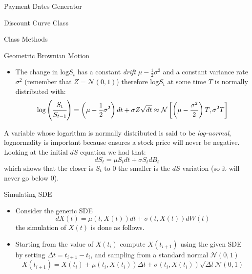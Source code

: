 \documentclass{beamer}
\begin{document}
\begin{frame}[fragile]{Payment Dates Generator}
\begin{itemize}
\begin{frame}{Discount Curve Class}
\begin{frame}{Class Methods}
\begin{itemize}
\begin{iptyhon}
\begin{frame}{Geometric Brownian Motion}
\begin{itemize}
\item The change in $\textrm{log} S_t$ has a constant \emph{drift} $\mu - \frac{1}{2}\sigma^2$ and a constant variance rate $\sigma^2$ (remember that $Z=\mathcal{N}(0,1)$) therefore $\textrm{log} S_t$ at some time $T$ is normally distributed with:
\begin{equation*}
\textrm{log}\left(\cfrac{S_t}{S_{t-1}}\right) = \left(\mu - \frac{1}{2}\sigma^2\right)dt + \sigma Z\sqrt{dt} \approx\mathcal{N}\left[\left(\mu-\frac{\sigma^2}{2}\right)T, \sigma^2 T\right]
\end{equation*}
\end{itemize}
\begin{block}{}
A variable whose logarithm is normally distributed is said to be \emph{log-normal}, lognormality is important because ensures a stock price will never be negative.
Looking at the initial $dS$ equation we had that:
\begin{equation*}
dS_t = \mu S_tdt + \sigma S_tdB_t
\end{equation*}
which shows that the closer is $S_t$ to 0 the smaller is the $dS$ variation (so it will never go below 0).
\end{block}
\end{frame}

\begin{frame}{Simulating SDE}
\begin{itemize}
\item  Consider the generic SDE
\begin{equation*}
dX(t) = \mu(t,X(t))dt + \sigma(t,X(t))dW(t)
\end{equation*}
the simulation of $X(t)$ is done as follows.
\item Starting from the value of $X(t_i)$ compute $X(t_{i+1})$ using the given SDE by setting $\Delta t = t_{i+1} - t_{i}$, and sampling from a standard normal $\mathcal{N}(0,1)$
\begin{equation*}
X(t_{i+1}) = X(t_i) + \mu(t_i,X(t_i))\Delta t + \sigma(t_i,X(t_i))\sqrt{\Delta t}\mathcal{N}(0,1)
\end{equation*}
\end{itemize}
\end{frame}


\end{iptyhon}
\end{itemize}
\end{frame}
\end{frame}
\end{itemize}
\end{frame}
\end{document}
